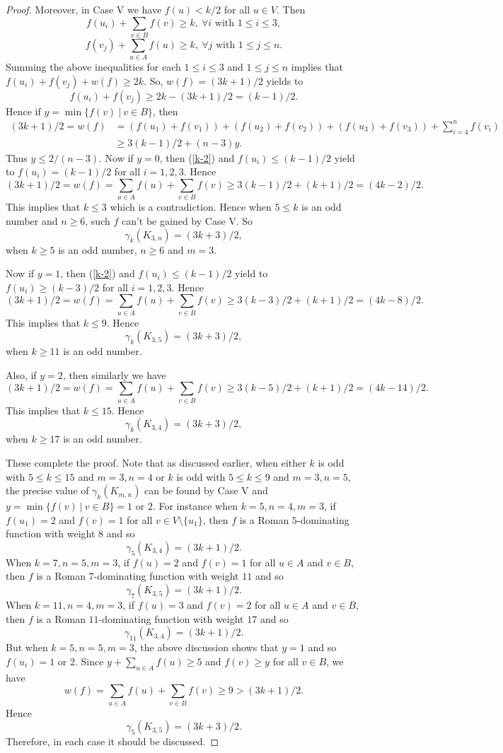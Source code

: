 \documentclass[12pt]{amsart}
\begin{document}
\begin{proof}
Moreover, in Case V we have $f(u)<k/2$ for all $u\in V$. Then
$$f(u_i)+\sum_{v\in B}f(v)\geq k, \ \forall i \textrm{ with }  1\leq i \leq 3,$$
$$f(v_j)+\sum_{u\in A}f(u)\geq k,  \ \forall j \textrm{ with }  1\leq j \leq n.$$
Summing the above inequalities for each $1\leq i \leq 3$ and $1\leq j \leq n$ implies that $f(u_i)+f(v_j)+w(f)\geq 2k$. So, $w(f)=(3k+1)/2$ yields to
\begin{equation}\label{k-2}
f(u_i)+f(v_j)\geq 2k-(3k+1)/2=(k-1)/2. 
\end{equation}
Hence if $y=\min\{f(v) \ | \ v\in B\}$, then
\begin{align*}
(3k+1)/2=w(f)&=(f(u_1)+f(v_1))+(f(u_2)+f(v_2))+(f(u_3)+f(v_3))+\sum_{i=4}^nf(v_i)\\
&\geq 3(k-1)/2+(n-3)y.
\end{align*}
Thus $y\leq 2/(n-3)$. Now if $y=0$, then (\ref{k-2}) and $f(u_i)\leq (k-1)/2$ yield to $f(u_i)=(k-1)/2$ for all $i=1,2,3$. Hence
$$(3k+1)/2=w(f)=\sum_{u\in A}f(u)+\sum_{v\in B}f(v)\geq 3(k-1)/2+(k+1)/2=(4k-2)/2.$$
This implies that $k\leq 3$ which is a contradiction. Hence when $5\leq k$ is an odd number and $n\geq 6$, such $f$ can't be gained by Case V. So
$$\gamma_k(K_{3,n})=(3k+3)/2,$$
when $k\geq 5$ is an odd number, $n\geq 6$ and $m=3$.

Now if $y=1$, then (\ref{k-2}) and $f(u_i)\leq (k-1)/2$ yield to $f(u_i)\geq (k-3)/2$ for all $i=1,2,3$. Hence
$$(3k+1)/2=w(f)=\sum_{u\in A}f(u)+\sum_{v\in B}f(v)\geq 3(k-3)/2+(k+1)/2=(4k-8)/2.$$
This implies that $k\leq 9$. Hence 
$$\gamma_k(K_{3,5})=(3k+3)/2,$$
when $k\geq 11$ is an odd number.

Also, if $y=2$, then similarly we have 
$$(3k+1)/2=w(f)=\sum_{u\in A}f(u)+\sum_{v\in B}f(v)\geq 3(k-5)/2+(k+1)/2=(4k-14)/2.$$
This implies that $k\leq 15$. Hence 
$$\gamma_k(K_{3,4})=(3k+3)/2,$$
when $k\geq 17$ is an odd number.
 
 These complete the proof. Note that as discussed earlier, when either $k$ is odd with  $5\leq k \leq 15$ and $m=3, n=4$ or $k$ is odd with $5\leq k \leq 9$ and $m=3, n=5$, the precise value of $\gamma_k(K_{m,n})$ can be found by Case V and $y=\min\{f(v) \ | \ v\in B\}=1$ or $2$. For instance when $k=5, n=4, m=3$, if $f(u_1)=2$ and $f(v)=1$ for all $v\in V\setminus \{u_1\}$, then  $f$ is a Roman $5$-dominating function with weight $8$ and so 
$$\gamma_5(K_{3,4})=(3k+1)/2.$$
When $k=7, n=5, m=3$, if $f(u)=2$ and $f(v)=1$ for all $u\in A$ and $v\in B$, then  $f$ is a Roman $7$-dominating function with weight $11$ and so 
$$\gamma_7(K_{3,5})=(3k+1)/2.$$
When $k=11, n=4, m=3$, if $f(u)=3$ and $f(v)=2$ for all $u\in A$ and $v\in B$, then  $f$ is a Roman $11$-dominating function with weight $17$ and so 
$$\gamma_{11}(K_{3,4})=(3k+1)/2.$$
But when $k=5, n=5, m=3$, the above discussion shows that $y=1$ and so $f(u_i)=1$ or $2$. Since $y+\sum_{u\in A}f(u)\geq 5$ and $f(v)\geq y$ for all $v\in B$, we have
$$w(f)=\sum_{u\in A}f(u)+\sum_{v\in B}f(v)\geq 9>(3k+1)/2.$$
Hence
$$\gamma_5(K_{3,5})=(3k+3)/2.$$
Therefore, in each case it should be discussed.

\end{proof}
\end{document}
